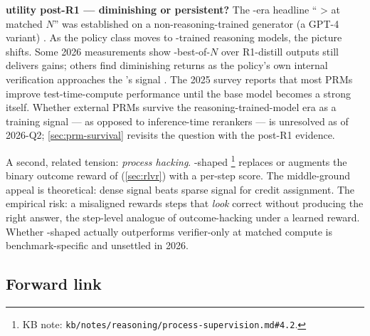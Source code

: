\begin{contradiction}
\textbf{ utility post-R1 — diminishing or persistent?}
The -era headline `` >  at matched $N$'' was established
on a non-reasoning-trained generator (a GPT-4 variant)
\citep[\S 4]{lightman2023-prm800k}. As the policy class moves to
-trained reasoning models, the picture shifts. Some 2026
measurements show -best-of-$N$ over R1-distill outputs still
delivers gains; others find diminishing returns as the policy's own
internal verification approaches the 's signal
\citep[\S 5]{thinkprm2025}. The 2025  survey
\citep{zheng2025-prm-survey} reports that most PRMs improve
test-time-compute performance until the base model becomes a strong
 itself. Whether external PRMs survive the
reasoning-trained-model era as a training signal --- as opposed to
inference-time rerankers --- is unresolved as of 2026-Q2; \cref{sec:prm-survival}
revisits the question with the post-R1 evidence.
\end{contradiction}

A second, related tension: \emph{process hacking}. -shaped 
\citep[\S 2.4]{lightman2023-prm800k}\footnote{KB note:
\nolinkurl{kb/notes/reasoning/process-supervision.md#4.2}.} replaces or
augments the binary outcome reward of  (\cref{sec:rlvr}) with a
per-step  score. The middle-ground appeal is theoretical: dense
signal beats sparse signal for credit assignment. The empirical risk:
a misaligned  rewards steps that \emph{look} correct without
producing the right answer, the step-level analogue of outcome-hacking
under a learned reward. Whether -shaped  actually outperforms
verifier-only  at matched compute is benchmark-specific and
unsettled in 2026.

\subsection{Forward link}
\label{sec:prm-forward}


